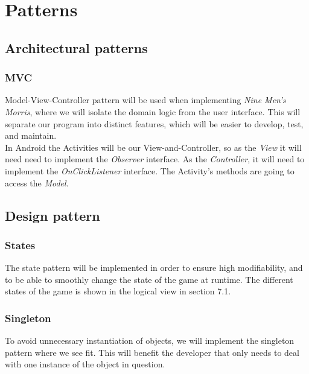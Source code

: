 \section{Patterns}

\subsection{Architectural patterns}

\subsubsection{MVC}
Model-View-Controller pattern will be used when implementing \emph{Nine Men’s Morris}, where we will isolate the domain logic from the user interface. This will separate our program into distinct features, which will be easier to develop, test, and maintain. \\
In Android the Activities will be our View-and-Controller, so as the \emph{View} it will need need to implement the \emph{Observer} interface. As the \emph{Controller}, it will need to implement the \emph{OnClickListener} interface. The Activity’s methods are going to access the \emph{Model}.

\subsection{Design pattern}
\subsubsection{States}
The state pattern will be implemented in order to ensure high modifiability, and to be able to smoothly change the state of the game at runtime. The different states of the game is shown in the logical view in section 7.1.

\subsubsection{Singleton}
To avoid unnecessary instantiation of objects, we will implement the singleton pattern where we see fit. This will benefit the developer that only needs to deal with one instance of the object in question.





